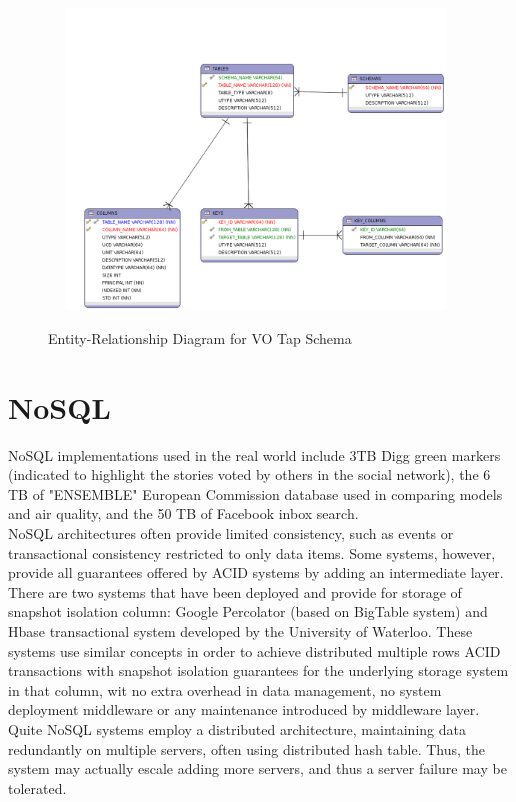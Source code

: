 \begin{figure}[H]
\centering
\includegraphics[width=11cm,height=8cm]{images/erd_postgres.png}\\
\caption{Entity-Relationship Diagram for VO Tap Schema}
\end{figure}


\section{NoSQL}

NoSQL implementations used in the real world include 3TB Digg green markers (indicated to highlight the stories voted by others in the social network), the 6 TB of "ENSEMBLE" European Commission database used in comparing models and air quality, and the 50 TB of Facebook inbox search.\\

NoSQL architectures often provide limited consistency, such as events or transactional consistency restricted to only data items. Some systems, however, provide all guarantees offered by ACID systems by adding an intermediate layer. There are two systems that have been deployed and provide for storage of snapshot isolation column: Google Percolator (based on BigTable system) and Hbase transactional system developed by the University of Waterloo. These systems use similar concepts in order to achieve distributed multiple rows ACID transactions with snapshot isolation guarantees for the underlying storage system in that column, wit no extra overhead in data management, no system deployment middleware or any maintenance introduced by middleware layer.\\

Quite NoSQL systems employ a distributed architecture, maintaining data redundantly on multiple servers, often using distributed hash table. Thus, the system may actually escale adding more servers, and thus a server failure may be tolerated.\\

